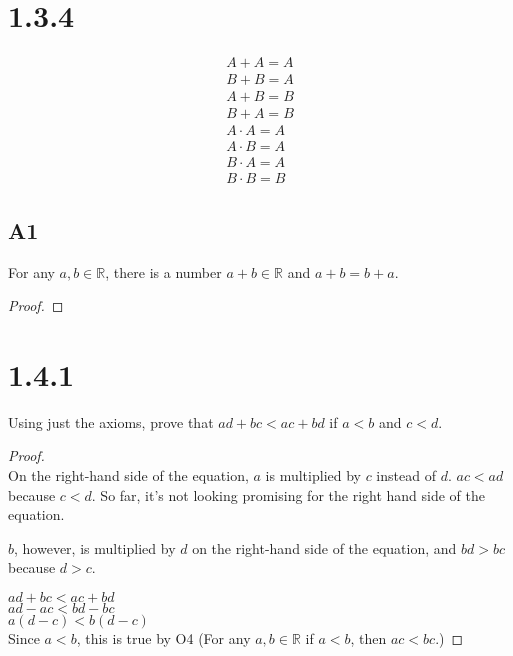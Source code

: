 \documentclass{article}
\begin{document}
    \section*{1.3.4}
        \begin{gather*}
            A+A=A \\
            B+B=A \\
            A+B=B \\
            B+A=B \\
            A \cdot A=A \\
            A \cdot B=A \\
            B \cdot A=A \\
            B \cdot B=B
        \end{gather*}

        \subsection*{A1}
        For any \( a, b \in \mathbb{R} \), there is a number \( a + b \in \mathbb{R} \) and \( a + b = b + a \).
        
        \begin{proof}
            
        \end{proof}

    \section*{1.4.1}
        Using just the axioms, prove that $ad+bc<ac+bd$ if $a<b$ and $c<d$.

        \begin{proof}\mbox{}\\
            On the right-hand side of the equation, $a$ is multiplied by $c$
            instead of $d$. $ac<ad$ because $c<d$. So far, it's not looking promising for the
            right hand side of the equation.
            
            $b$, however, is multiplied by $d$ on the right-hand side of the equation, and
            $bd>bc$ because $d>c$.

            $ad+bc<ac+bd$ \\
            $ad-ac<bd-bc$ \\
            $a(d-c)<b(d-c)$ \\
            Since $a<b$, this is true by O4 (For any $a,b \in \mathbb{R}$ if $a<b$, then $ac<bc$.)
        \end{proof}
        
\end{document}
